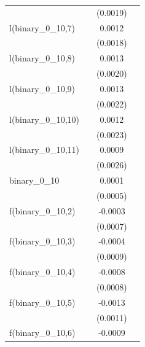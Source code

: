 \begin{tabular}{lccc}
                                    &          & (0.0019)              &   \\   
   l(binary\_0\_10,7)               &          & 0.0012                &   \\   
                                    &          & (0.0018)              &   \\   
   l(binary\_0\_10,8)               &          & 0.0013                &   \\   
                                    &          & (0.0020)              &   \\   
   l(binary\_0\_10,9)               &          & 0.0013                &   \\   
                                    &          & (0.0022)              &   \\   
   l(binary\_0\_10,10)              &          & 0.0012                &   \\   
                                    &          & (0.0023)              &   \\   
   l(binary\_0\_10,11)              &          & 0.0009                &   \\   
                                    &          & (0.0026)              &   \\   
   binary\_0\_10                    &          & 0.0001                &   \\   
                                    &          & (0.0005)              &   \\   
   f(binary\_0\_10,2)               &          & -0.0003               &   \\   
                                    &          & (0.0007)              &   \\   
   f(binary\_0\_10,3)               &          & -0.0004               &   \\   
                                    &          & (0.0009)              &   \\   
   f(binary\_0\_10,4)               &          & -0.0008               &   \\   
                                    &          & (0.0008)              &   \\   
   f(binary\_0\_10,5)               &          & -0.0013               &   \\   
                                    &          & (0.0011)              &   \\   
   f(binary\_0\_10,6)               &          & -0.0009               &   \\   

\end{tabular}

